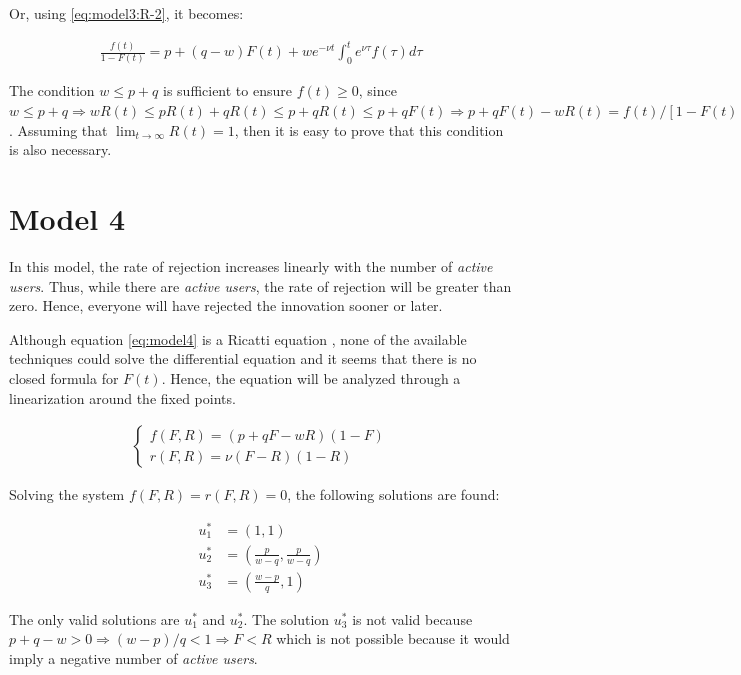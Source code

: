 Or, using \ref{eq:model3:R-2}, it becomes:

\begin{align}
\frac{f(t)}{1-F(t)} = p + (q-w)F(t) + w e^{-\nu t} \int_0^t e^{\nu \tau} f(\tau) d\tau
\end{align}

The condition $w \leq p+q$ is sufficient to ensure $f(t) \geq 0$, since $w \leq p+q \Rightarrow wR(t) \leq pR(t) + qR(t) \leq p + qR(t) \leq p + qF(t) \Rightarrow p + qF(t) - wR(t) = f(t) / [1 - F(t)] \geq 0 \Rightarrow f(t) \geq 0$. Assuming that $\lim_{t \rightarrow \infty} R(t) = 1$, then it is easy to prove that this condition is also necessary.


\section{Model 4}

In this model, the rate of rejection increases linearly with the number of \textit{active users}. Thus, while there are \textit{active users}, the rate of rejection will be greater than zero. Hence, everyone will have rejected the innovation sooner or later.

Although equation \ref{eq:model4} is a Ricatti equation \citep{bittanti1991riccati}, none of the available techniques could solve the differential equation and it seems that there is no closed formula for $F(t)$. Hence, the equation will be analyzed through a linearization around the fixed points.

\begin{align}
\begin{cases}
f(F, R) = (p + qF - wR)(1 - F) \\
r(F, R) = \nu (F-R) (1-R)
\end{cases}
\end{align}

Solving the system $f(F, R) = r(F, R) = 0$, the following solutions are found:

\begin{align}
u_1^* &= (1, 1) \\
u_2^* &= \left( \frac{p}{w-q}, \frac{p}{w-q} \right) \\
u_3^* &= \left( \frac{w-p}{q}, 1 \right)
\end{align}

The only valid solutions are $u_1^*$ and $u_2^*$. The solution $u_3^*$ is not valid because $p+q-w > 0 \Rightarrow (w-p)/q < 1 \Rightarrow F < R$ which is not possible because it would imply a negative number of \textit{active users}.

